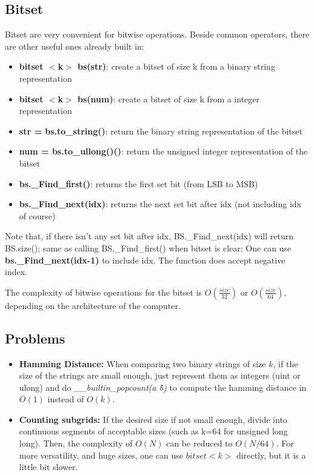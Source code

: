    \subsection{Bitset}

    Bitset are very convenient for bitwise operations. Beside common operators, there are other useful ones already built in:
    
    \begin{itemize} 
        \item \textbf{bitset $<$k$>$ bs(str)}: create a bitset of size k from a binary string representation
        \item \textbf{bitset $<$k$>$ bs(num)}: create a bitset of size k from a integer representation
        \item \textbf{str = bs.to\_string()}: return the binary string representation of the bitset
        \item \textbf{num = bs.to\_ullong()()}: return the unsigned integer representation of the bitset
        \item \textbf{bs.\_Find\_first()}: returns the first set bit (from LSB to MSB)
        \item \textbf{bs.\_Find\_next(idx)}: returns the next set bit after idx (not including idx of course)
    \end{itemize}

    Note that, if there isn't any set bit after idx, BS.\_Find\_next(idx) will return BS.size(); 
    same as calling BS.\_Find\_first() when bitset is clear;
    One can use \textbf{bs.\_Find\_next(idx-1)} to include idx. The function does accept negative index. 

    The complexity of bitwise operations for the bitset is $O(\frac{size}{32})$ or $O(\frac{size}{64})$, 
    depending on the architecture of the computer.
    
    \subsection{Problems}
    
    \begin{itemize}
        \item \textbf{Hamming Distance:} When comparing two binary strings of size $k$, if the size of the strings are small enough, 
        just represent them as integers (uint or ulong) and do \textit{\_\_builtin\_popcount(a \^ b)} to compute the hamming distance in $O(1)$ instead of $O(k)$.

        \item \textbf{Counting subgrids:} If the desired size if not small enough, divide into continuous segments of acceptable sizes (such as k=64 for unsigned long long).
        Then, the complexity of $O(N)$ can be reduced to $O(N/64)$. 
        For more versatility, and huge sizes, one can use $bitset<k>$ directly, but it is a little bit slower.

    \end{itemize}

